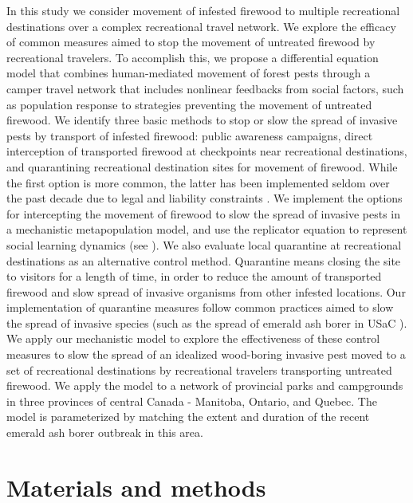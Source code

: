 In this study we consider movement of infested firewood to multiple recreational destinations over a complex recreational travel network. We explore the efficacy of common measures aimed to stop the movement of untreated firewood by recreational travelers. To accomplish this, we propose a differential equation model that combines human-mediated movement of forest pests through a camper travel network that includes nonlinear feedbacks from social factors, such as population response to strategies preventing the movement of untreated firewood. We identify three basic methods to stop or slow the spread of invasive pests by transport of infested firewood: public awareness campaigns, direct interception of transported firewood at checkpoints near recreational destinations, and quarantining recreational destination sites for movement of firewood. While the first option is more common, the latter has been implemented seldom over the past decade due to legal and liability constraints \cite{reid2017,weber2006,nearing2012, haack2010incidence}. We implement the options for intercepting the movement of firewood to slow the spread of invasive pests in a mechanistic metapopulation model, and use the replicator equation to represent social learning dynamics (see \cite{henderson2013carrot,barlow2014modelling,bauch2005imitation,hofbauer1998evolutionary}). We also evaluate local quarantine at recreational destinations as an alternative control method. Quarantine means closing the site to visitors for a length of time, in order to reduce the amount of transported firewood and slow spread of invasive organisms from other infested locations. Our implementation of quarantine measures follow common practices aimed to slow the spread of invasive species (such as the spread of emerald ash borer in USaC \cite{muirhead2006modelling,gottwald2001citrus}). We apply our mechanistic model to explore the effectiveness of these control measures to slow the spread of an idealized wood-boring invasive pest moved to a set of recreational destinations by recreational travelers transporting untreated firewood. We apply the model to a network of provincial parks and campgrounds in three provinces of central Canada - Manitoba, Ontario, and Quebec. The model is parameterized by matching the extent and duration of the recent emerald ash borer outbreak in this area.

\section{Materials and methods}



